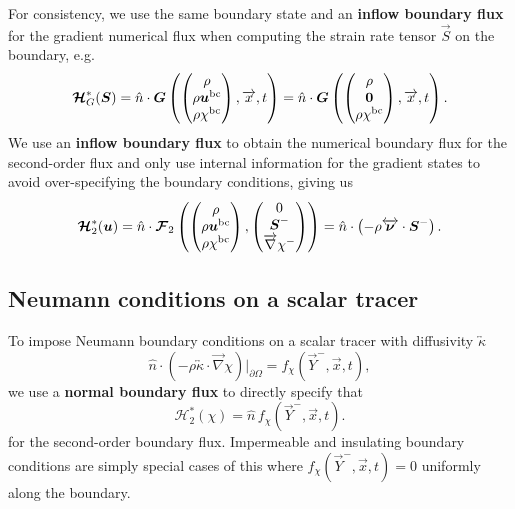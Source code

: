 \documentclass{report}
\numberwithin{equation}{section}
\begin{document}
For consistency, we use the same boundary state and an \textbf{inflow boundary flux} for the gradient numerical flux when computing the strain rate tensor $\vec S$  on the boundary, e.g. 
\begin{equation}
    \boldsymbol{{\mathcal{H}}}_G^*(\boldsymbol{{S}}) = \hat n \cdot \boldsymbol{{G}} \left(\begin{pmatrix} \rho \\ \rho \boldsymbol{{u}}^{\text{bc}} \\ \rho \chi^{\text{bc}} \end{pmatrix}, \overrightarrow{x}, t \right) 
    = \hat n \cdot \boldsymbol{{G}} \left(\begin{pmatrix} \rho \\ \boldsymbol{{0}} \\ \rho \chi^{\text{bc}} \end{pmatrix}, \overrightarrow{x}, t \right) .
\end{equation}
We use an \textbf{inflow boundary flux} to obtain the numerical boundary flux for the second-order flux and only use internal information for the gradient states to avoid over-specifying the boundary conditions, giving us
\begin{equation}
    \boldsymbol{{\mathcal{H}}}_2^*(\boldsymbol{{u}}) = \hat n \cdot \boldsymbol{{\mathcal{F}}}_2\left(
        \begin{pmatrix} \rho \\ \rho \boldsymbol{{u}}^{\text{bc}} \\ \rho \chi^{\text{bc}} \end{pmatrix}, 
        \begin{pmatrix} 0 \\ \boldsymbol{{S}}^- \\ \overrightarrow{\nabla} \chi^- \end{pmatrix}
    \right)
    = \hat n \cdot \left( - \rho \overleftrightarrow{\boldsymbol{{\nu}}} \cdot \boldsymbol{{S}}^- \right).
\end{equation}

\subsection{Neumann conditions on a scalar tracer}

To impose Neumann boundary conditions on a scalar tracer with diffusivity $\overleftrightarrow{\kappa}$
\begin{equation}
    \hat n \cdot \left( - \rho \overleftrightarrow{\kappa} \cdot  \overrightarrow{\nabla} \chi \right)\bigg|_{\partial \Omega} = f_\chi \left( \vec Y^-, \overrightarrow{x}, t \right),
\end{equation}
we use a \textbf{normal boundary flux} to directly specify that
\begin{equation}
    \mathcal{H}_2^*(\chi) = \hat n \, f_\chi(\vec Y^-, \overrightarrow{x}, t).
\end{equation}
for the second-order boundary flux. Impermeable and insulating boundary conditions are simply special cases of this where $f_\chi(\vec Y^-, \overrightarrow{x}, t) = 0$ uniformly along the boundary.
\end{document}
